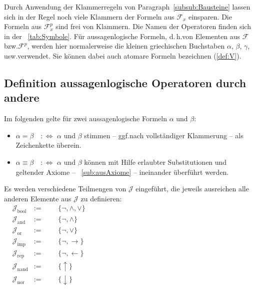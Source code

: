 \documentclass[english,ngerman,parskip=half,headsepline,footsepline,
	fleqn,notitlepage]{scrreprt}
\makeatletter
\newcommand*{\metadefeq}{:\Leftrightarrow}%
\newcommand*{\defeq}{:=}%
\newcommand*{\eq}{=}%
\newcommand*{\lrep}{\leftarrow}%
\newcommand*{\limp}{\rightarrow}%
\newcommand*{\lnand}{\uparrow}%
\newcommand*{\lnor}{\downarrow}%
\newcommand*{\asF}{\mathcal{F}}%
\newcommand*{\asFp}{\mathcal{F}^p}%
\newcommand*{\asFx}{\mathcal{F}_x}%
\newcommand*{\asFxp}{\mathcal{F}_x^p}%
\newcommand*{\asJ}{\mathcal{J}}%
\newcommand*{\asJx}{\mathcal{J}_x}%
\newcommand*{\xAnd}{\mathrm{and}}%
\newcommand*{\xBool}{\mathrm{bool}}%
\newcommand*{\xImp}{\mathrm{imp}}%
\newcommand*{\xNand}{\mathrm{nand}}%
\newcommand*{\xNor}{\mathrm{nor}}%
\newcommand*{\xOr}{\mathrm{or}}%
\newcommand*{\xRep}{\mathrm{rep}}%
\newcommand*{\formulatoleft}{&&&&&&&&&&}%
\newcommand*{\subsubsectionname}{Paragraph}
\newcommand*{\textbzw}{bzw.\@ }
\newcommand*{\textdh}{d.\@\,h.\@ }
\newcommand*{\textggf}{ggf.\@ }
\newcommand*{\textusw}{usw.\@ }
\makeatother
\begin{document}
	Durch Anwendung der Klammerregeln von \subsubsectionname~\vref{subsub:Bausteine} lassen sich in der Regel noch viele Klammern der Formeln aus $\asFx$ einsparen.
	Die Formeln aus $\asFxp$ sind frei von Klammern.
	Die Namen der Operatoren finden sich in der \tablename~\vref{tab:Symbole}.
	Für aussagenlogische Formeln, \textdh von Elementen aus $\asF$ \textbzw $\asFp$, werden hier normalerweise die kleinen griechischen Buchstaben $\alpha$, $\beta$, $\gamma$, \textusw verwendet.
	Sie können dabei auch atomare Formeln bezeichnen (\seename \eqref{def:V}).

	\subsection{Definition aussagenlogische Operatoren durch andere}%
	\label{sub:ausOperatorDef}

	Im folgenden gelte für zwei aussagenlogische Formeln $\alpha$ und $\beta$:
	\begin{itemize}

		\item $\alpha  \eq   \beta \quad \metadefeq$ \quad $\alpha$ und $\beta$ stimmen -- \textggf nach vollständiger Klammerung -- als Zeichenkette überein.

		\item $\alpha \equiv \beta \quad \metadefeq$ \quad $\alpha$ und $\beta$ können mit Hilfe erlaubter Substitutionen und geltender Axiome -- \seename~\vref{sub:ausAxiome} -- ineinander überführt werden.

	\end{itemize}


	Es werden verschiedene Teilmengen von $\asJ$ eingeführt, die jeweils ausreichen alle anderen Elemente aus $\asJ$ zu definieren:
	\begin{align}
		& \asJ_\xBool &\defeq & & & \{ \lnot, \land, \lor \} \label{def:Jbool}\\
		& \asJ_\xAnd  &\defeq & & & \{ \lnot, \land       \} \label{def:Jand} \\
		& \asJ_\xOr   &\defeq & & & \{ \lnot, \lor        \} \label{def:Jor}  \\
		& \asJ_\xImp  &\defeq & & & \{ \lnot, \limp       \} \label{def:Jimp} \\
		& \asJ_\xRep  &\defeq & & & \{ \lnot, \lrep       \} \label{def:Jrep} \\
		& \asJ_\xNand &\defeq & & & \{ \lnand             \} \label{def:Jnand}\\
		& \asJ_\xNor  &\defeq & & & \{ \lnor              \} \label{def:Jnor}
		\formulatoleft\formulatoleft\formulatoleft\formulatoleft\formulatoleft
	\end{align}
\end{document}
